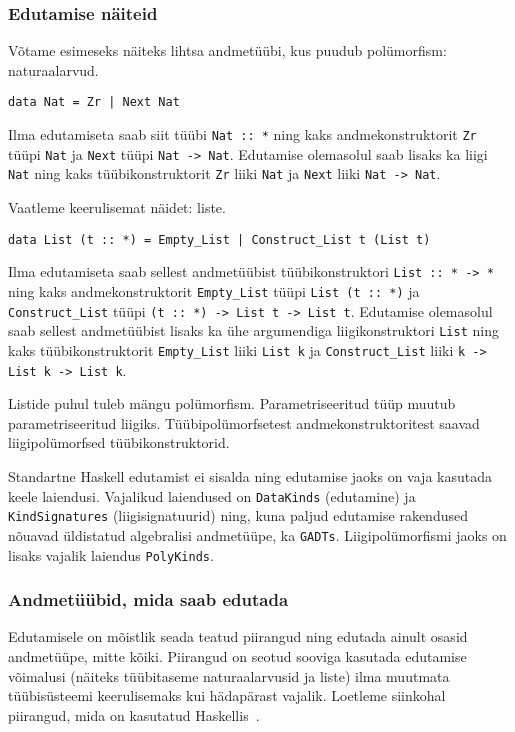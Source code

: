 \documentclass[12pt]{article}
\begin{document}
      \subsubsection{Edutamise näiteid}
        Võtame esimeseks näiteks lihtsa andmetüübi, kus puudub polümorfism: naturaalarvud.

        \begin{verbatim}data Nat = Zr | Next Nat\end{verbatim}

        Ilma edutamiseta saab siit tüübi \verb!Nat :: *! ning kaks andmekonstruktorit \verb!Zr! tüüpi \verb!Nat! ja \verb!Next! tüüpi \verb!Nat -> Nat!. Edutamise olemasolul saab lisaks ka liigi \verb!Nat! ning kaks tüübikonstruktorit \verb!Zr! liiki \verb!Nat! ja \verb!Next! liiki \verb!Nat -> Nat!.

        Vaatleme keerulisemat näidet: liste.

        \begin{verbatim}data List (t :: *) = Empty_List | Construct_List t (List t)\end{verbatim}

        Ilma edutamiseta saab sellest andmetüübist tüübikonstruktori \verb!List :: * -> *! ning kaks andmekonstruktorit \verb!Empty_List! tüüpi \verb!List (t :: *)! ja \verb!Construct_List! tüüpi \verb!(t :: *) -> List t -> List t!. Edutamise olemasolul saab sellest andmetüübist lisaks ka ühe argumendiga liigikonstruktori \verb!List! ning kaks tüübikonstruktorit \verb!Empty_List! liiki \verb!List k! ja \verb!Construct_List! liiki \verb!k -> List k -> List k!.

        Listide puhul tuleb mängu polümorfism. Parametriseeritud tüüp muutub parametriseeritud liigiks. Tüübipolümorfsetest andmekonstruktoritest saavad liigipolümorfsed tüübikonstruktorid.

        Standartne Haskell edutamist ei sisalda ning edutamise jaoks on vaja kasutada keele laiendusi. Vajalikud laiendused on \verb!DataKinds! (edutamine) ja \verb!KindSignatures! (liigisignatuurid) ning, kuna paljud edutamise rakendused nõuavad üldistatud algebralisi andmetüüpe, ka \verb!GADTs!. Liigipolümorfismi jaoks on lisaks vajalik laiendus \verb!PolyKinds!.
      \subsubsection{Andmetüübid, mida saab edutada}\label{kitsendused}
        Edutamisele on mõistlik seada teatud piirangud ning edutada ainult osasid andmetüüpe, mitte kõiki. Piirangud on seotud sooviga kasutada edutamise võimalusi (näiteks tüübitaseme naturaalarvusid ja liste) ilma muutmata tüübisüsteemi keerulisemaks kui hädapärast vajalik. Loetleme siinkohal piirangud, mida on kasutatud Haskellis~\cite{Giv}.
\end{document}
